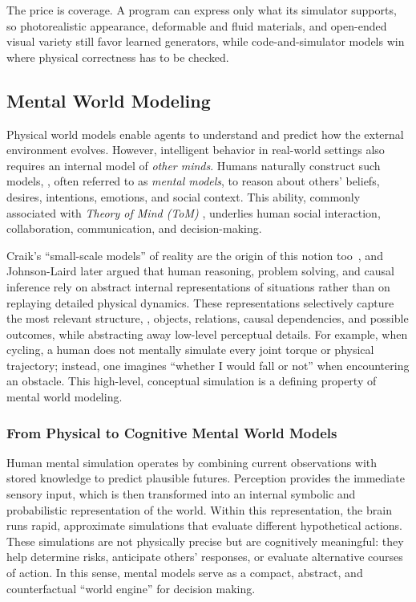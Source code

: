 The price is coverage. 
A program can express only what its simulator supports, so photorealistic appearance, deformable and fluid materials, and open-ended visual variety still favor learned generators, while code-and-simulator models win where physical correctness has to be checked.


\subsection{Mental World Modeling}
\label{subsec:p3_s8_6_mental}


Physical world models enable agents to understand and predict how the external environment evolves.
However, intelligent behavior in real-world settings also requires an internal model of \emph{other minds}.
Humans naturally construct such models, \ie, often referred to as \emph{mental models}, to reason about others' beliefs, desires, intentions, emotions, and social context.
This ability, commonly associated with \emph{Theory of Mind (ToM)} \cite{astington1995theory}, underlies human social interaction, collaboration, communication, and decision-making.



Craik's ``small-scale models'' of reality are the origin of this notion too~\cite{nersessian1993theoretician,staggers1993mental}, and Johnson-Laird later argued that human reasoning, problem solving, and causal inference rely on abstract internal representations of situations rather than on replaying detailed physical dynamics.
These representations selectively capture the most relevant structure, \ie, objects, relations, causal dependencies, and possible outcomes, while abstracting away low-level perceptual details.
For example, when cycling, a human does not mentally simulate every joint torque or physical trajectory; instead, one imagines ``whether I would fall or not'' when encountering an obstacle.
This high-level, conceptual simulation is a defining property of mental world modeling.



\subsubsection{From Physical to Cognitive Mental World Models}
Human mental simulation operates by combining current observations with stored knowledge to predict plausible futures.
Perception provides the immediate sensory input, which is then transformed into an internal symbolic and probabilistic representation of the world.
Within this representation, the brain runs rapid, approximate simulations that evaluate different hypothetical actions.
These simulations are not physically precise but are cognitively meaningful: they help determine risks, anticipate others' responses, or evaluate alternative courses of action.
In this sense, mental models serve as a compact, abstract, and counterfactual ``world engine'' for decision making.


